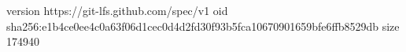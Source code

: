 version https://git-lfs.github.com/spec/v1
oid sha256:e1b4ce0ee4c0a63f06d1cec0d4d2fd30f93b5fca10670901659bfe6ffb8529db
size 174940

